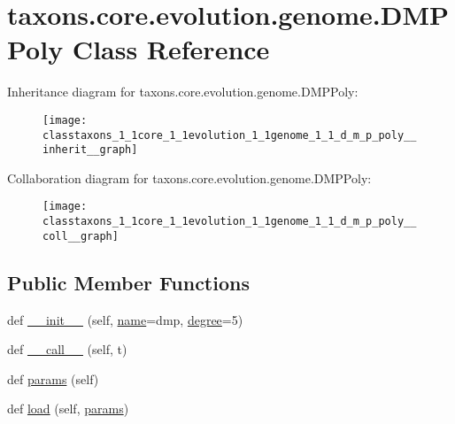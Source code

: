 \hypertarget{classtaxons_1_1core_1_1evolution_1_1genome_1_1_d_m_p_poly}{}\section{taxons.\+core.\+evolution.\+genome.\+D\+M\+P\+Poly Class Reference}
\label{classtaxons_1_1core_1_1evolution_1_1genome_1_1_d_m_p_poly}


Inheritance diagram for taxons.\+core.\+evolution.\+genome.\+D\+M\+P\+Poly\+:
\nopagebreak
\begin{figure}[H]
\begin{center}
\leavevmode
\texttt{[image: classtaxons\_1\_1core\_1\_1evolution\_1\_1genome\_1\_1\_d\_m\_p\_poly\_\_inherit\_\_graph]}
\end{center}
\end{figure}


Collaboration diagram for taxons.\+core.\+evolution.\+genome.\+D\+M\+P\+Poly\+:
\nopagebreak
\begin{figure}[H]
\begin{center}
\leavevmode
\texttt{[image: classtaxons\_1\_1core\_1\_1evolution\_1\_1genome\_1\_1\_d\_m\_p\_poly\_\_coll\_\_graph]}
\end{center}
\end{figure}
\subsection*{Public Member Functions}
\begin{DoxyCompactItemize}
\item 
def \hyperlink{classtaxons_1_1core_1_1evolution_1_1genome_1_1_d_m_p_poly_ae9f90b8339f503aada9b4519cecb09f5}{\+\_\+\+\_\+init\+\_\+\+\_\+} (self, \hyperlink{classtaxons_1_1core_1_1evolution_1_1genome_1_1_d_m_p_poly_ab92df858c268b88db499e13dd8a98b1a}{name}=\textquotesingle{}dmp\textquotesingle{}, \hyperlink{classtaxons_1_1core_1_1evolution_1_1genome_1_1_d_m_p_poly_a40c376f5940c47b0e31dca7dfb4ab564}{degree}=5)
\item 
def \hyperlink{classtaxons_1_1core_1_1evolution_1_1genome_1_1_d_m_p_poly_abf998fe870cc923082abc984fa75f23f}{\+\_\+\+\_\+call\+\_\+\+\_\+} (self, t)
\item 
def \hyperlink{classtaxons_1_1core_1_1evolution_1_1genome_1_1_d_m_p_poly_ae1626c36cf6d82bf8ff16249eb8f66f7}{params} (self)
\item 
def \hyperlink{classtaxons_1_1core_1_1evolution_1_1genome_1_1_d_m_p_poly_a55b40ea0f7bc38ba1b5a2be593870f4c}{load} (self, \hyperlink{classtaxons_1_1core_1_1evolution_1_1genome_1_1_d_m_p_poly_ae1626c36cf6d82bf8ff16249eb8f66f7}{params})
\end{DoxyCompactItemize}
